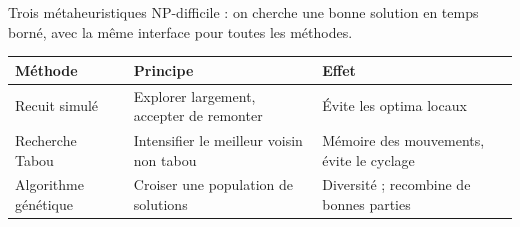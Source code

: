 \begin{frame}{Trois métaheuristiques}
  \footnotesize
  NP-difficile : on cherche une bonne solution en temps borné, avec la même
  interface pour toutes les méthodes.

  \vspace{0.15cm}
  \renewcommand{\arraystretch}{1.18}
  \begin{tabular}{p{2.9cm}p{4.5cm}p{4.5cm}}
    \toprule
    \textbf{Méthode} & \textbf{Principe} & \textbf{Effet} \\
    \midrule
    Recuit simulé & Explorer largement, accepter de remonter
      & Évite les optima locaux \\
    Recherche Tabou & Intensifier le meilleur voisin non tabou
      & Mémoire des mouvements, évite le cyclage \\
    Algorithme génétique & Croiser une population de solutions
      & Diversité ; recombine de bonnes parties \\
    \bottomrule
  \end{tabular}

\end{frame}

